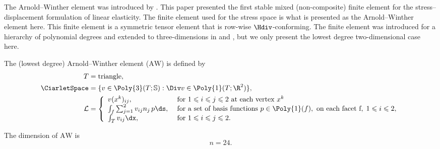 The Arnold--Winther element was introduced
by \citet{ArnoldWinther2002}. This paper presented the first stable
mixed (non-composite) finite element for the stress--displacement
formulation of linear elasticity. The finite element used for the
stress space is what is presented as the Arnold--Winther element
here. This finite element is a symmetric tensor element that is
row-wise $\Hdiv$-conforming. The finite element was introduced for a
hierarchy of polynomial degrees and extended to three-dimensions
in \citet{AdamsCockburn2005} and \citet{ArnoldAwanouWinther2008}, but we
only present the lowest degree two-dimensional case here.

\begin{definition}
  The (lowest degree) Arnold--Winther element ($\mathrm{AW}$) is
  defined by
  \begin{align}
    T &= \mathrm{triangle}{},  \\
    \CiarletSpace &= \{ v \in \Poly{3}(T; \mathbb{S}) :
                     \Div v \in \Poly{1}(T; \R^2) \}, \\
    \mathcal{L} &=
    \left \{
    \begin{array}{ll}
      v(x^k)_{ij},  & \text{ for } 1 \leqslant i \leqslant j \leqslant 2
      \text{ at each vertex } x^k \\
      \int_{f} \sum_{j=1}^2 v_{ij} n_j \, p \ds,
      & \text{ for a set of basis functions } p \in \Poly{1}(f),
      \text{ on each facet } $f$, \; 1 \leqslant i \leqslant 2, \\
      \int_{T} v_{ij} \dx,
      & \text{ for } 1 \leqslant i \leqslant j \leqslant 2.
    \end{array}
    \right .
  \end{align}
\end{definition}
The dimension of $\mathrm{AW}$ is
\begin{equation}
  n = 24.
\end{equation}

